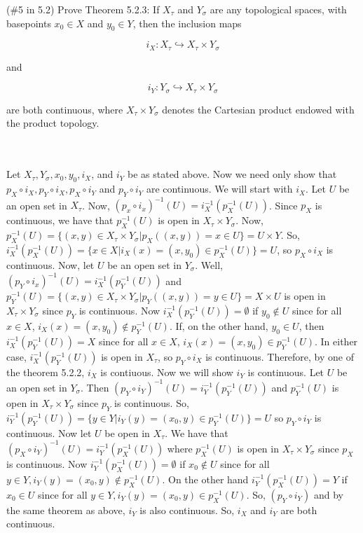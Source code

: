 (\#5 in 5.2) Prove Theorem 5.2.3: If $X_{\tau}$ and $Y_{\sigma}$ are any topological spaces, with
basepoints $x_0\in X$ and $y_0\in Y$, then the inclusion maps

$$i_X:X_{\tau}\hookrightarrow X_{\tau}\times Y_{\sigma}$$

and

$$i_Y:Y_{\sigma}\hookrightarrow X_{\tau}\times Y_{\sigma}$$

are both continuous, where $X_{\tau}\times Y_{\sigma}$ denotes the Cartesian product endowed with the
product topology.\\\\

\begin{solution}\renewcommand{\qedsymbol}{}\ \\
Let $X_{\tau}, Y_{\sigma}, x_0, y_0, i_X$, and $i_Y$ be as stated above. Now we need only show that
$p_X\circ i_X, p_Y\circ i_X, p_X\circ i_Y$ and $p_Y\circ i_Y$ are continuous. We will start with $i_X$.
Let $U$ be an open set in $X_{\tau}$. Now, $(p_x\circ i_x)^{-1}(U)=i_X^{-1}(p_X^{-1}(U))$. Since $p_X$
is continuous, we have that $p_X^{-1}(U)$ is open in $X_{\tau}\times Y_{\sigma}$. Now,
$p_X^{-1}(U)=\{(x,y)\in X_{\tau}\times Y_{\sigma}|p_X((x,y))=x\in U\}=U\times Y$. So,
$i_X^{-1}(p_X^{-1}(U))=\{x\in X|i_X(x)=(x,y_0)\in p_X^{-1}(U)\}=U$, so $p_X\circ i_X$ is continuous.
Now, let $U$ be an open set in $Y_{\sigma}$. Well, $(p_Y\circ i_x)^{-1}(U)=i_X^{-1}(p_Y^{-1}(U))$ and
$p_Y^{-1}(U)=\{(x,y)\in X_{\tau}\times Y_{\sigma}|p_Y((x,y))=y\in U\}=X\times U$ is open in
$X_{\tau}\times Y_{\sigma}$ since $p_Y$ is continuous. Now $i_X^{-1}(p_Y^{-1}(U))=\emptyset$ if
$y_0\notin U$ since for all $x\in X$, $i_X(x)=(x,y_0)\notin p_Y^{-1}(U)$. If, on the other hand,
$y_0\in U$, then $i_X^{-1}(p_Y^{-1}(U))=X$ since for all $x\in X$, $i_X(x)=(x,y_0)\in p_Y^{-1}(U)$. In
either case, $i_X^{-1}(p_Y^{-1}(U))$ is open in $X_{\tau}$, so $p_Y\circ i_X$ is continuous. Therefore,
by one of the theorem 5.2.2, $i_X$ is contiuous. Now we will show $i_Y$ is continuous. Let $U$ be an
open set in $Y_{\sigma}$. Then $(p_Y\circ i_Y)^{-1}(U)=i_Y^{-1}(p_Y^{-1}(U))$ and $p_Y^{-1}(U)$ is
open in $X_{\tau}\times Y_{\sigma}$ since $p_Y$ is continuous. So,
$i_Y^{-1}(p_Y^{-1}(U))=\{y\in Y|i_Y(y)=(x_0,y)\in p_Y^{-1}(U)\}=U$ so $p_Y\circ i_Y$ is continuous. Now
let $U$ be open in $X_{\tau}$. We have that $(p_X\circ i_Y)^{-1}(U)=i_Y^{-1}(p_X^{-1}(U))$ where
$p_X^{-1}(U)$ is open in $X_{\tau}\times Y_{\sigma}$ since $p_X$ is continuous. Now
$i_Y^{-1}(p_X^{-1}(U))=\emptyset$ if $x_0\notin U$ since for all
$y\in Y, i_Y(y)=(x_0,y)\notin p_X^{-1}(U)$. On the other hand $i_Y^{-1}(p_X^{-1}(U))=Y$ if $x_0\in U$
since for all $y\in Y, i_Y(y)=(x_0,y)\in p_X^{-1}(U)$. So, $(p_Y\circ i_Y)$ and by the same theorem as
above, $i_Y$ is also continuous. So, $i_X$ and $i_Y$ are both continuous.

\end{solution}